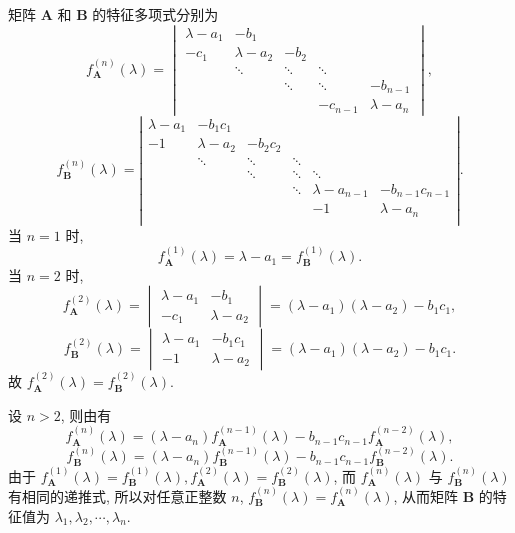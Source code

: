\documentclass[../../main.tex]{subfiles}%
\begin{document}
\begin{solution}

矩阵 \(\boldsymbol{A}\) 和 \(\boldsymbol{B}\) 的特征多项式分别为
\[
f_{\boldsymbol{A}}^{(n)}(\lambda) = \begin{vmatrix} \lambda - a_1 & -b_1 \\ -c_1 & \lambda - a_2 & -b_2 \\ & \ddots & \ddots & \ddots \\ & & \ddots & \ddots & -b_{n - 1} \\ & & & -c_{n - 1} & \lambda - a_n \end{vmatrix},
\]
\[
f_{\boldsymbol{B}}^{(n)}(\lambda) = \left| \begin{matrix}
\lambda -a_1&		-b_1c_1&		&		&		&		\\
-1&		\lambda -a_2&		-b_2c_2&		&		&		\\
&		\ddots&		\ddots&		\ddots&		&		\\
&		&		\ddots&		\ddots&		\ddots&		\\
&		&		&		\ddots&		\lambda -a_{n-1}&		-b_{n-1}c_{n-1}\\
&		&		&		&		-1&		\lambda -a_n\\
\end{matrix} \right|.
\]
当 \(n = 1\) 时,
\[
f_{\boldsymbol{A}}^{(1)}(\lambda) = \lambda - a_1 = f_{\boldsymbol{B}}^{(1)}(\lambda).
\]
当 \(n = 2\) 时,
\[
f_{\boldsymbol{A}}^{(2)}(\lambda) = \begin{vmatrix} \lambda - a_1 & -b_1 \\ -c_1 & \lambda - a_2 \end{vmatrix} = (\lambda - a_1)(\lambda - a_2) - b_1c_1,
\]
\[
f_{\boldsymbol{B}}^{(2)}(\lambda) = \begin{vmatrix} \lambda - a_1 & -b_1c_1 \\ -1 & \lambda - a_2 \end{vmatrix} = (\lambda - a_1)(\lambda - a_2) - b_1c_1.
\]
故 \(f_{\boldsymbol{A}}^{(2)}(\lambda) = f_{\boldsymbol{B}}^{(2)}(\lambda)\).

设 \(n > 2\), 则由有
\[
f_{\boldsymbol{A}}^{(n)}(\lambda) = (\lambda - a_n)f_{\boldsymbol{A}}^{(n - 1)}(\lambda) - b_{n - 1}c_{n - 1}f_{\boldsymbol{A}}^{(n - 2)}(\lambda),
\]
\[
f_{\boldsymbol{B}}^{(n)}(\lambda) = (\lambda - a_n)f_{\boldsymbol{B}}^{(n - 1)}(\lambda) - b_{n - 1}c_{n - 1}f_{\boldsymbol{B}}^{(n - 2)}(\lambda).
\]
由于 \(f_{\boldsymbol{A}}^{(1)}(\lambda) = f_{\boldsymbol{B}}^{(1)}(\lambda), f_{\boldsymbol{A}}^{(2)}(\lambda) = f_{\boldsymbol{B}}^{(2)}(\lambda)\), 而 \(f_{\boldsymbol{A}}^{(n)}(\lambda)\) 与 \(f_{\boldsymbol{B}}^{(n)}(\lambda)\) 有相同的递推式, 所以对任意正整数 \(n\), \(f_{\boldsymbol{B}}^{(n)}(\lambda) = f_{\boldsymbol{A}}^{(n)}(\lambda)\), 从而矩阵 \(\boldsymbol{B}\) 的特征值为 \(\lambda_1, \lambda_2, \cdots, \lambda_n\).

\end{solution}
\end{document}
